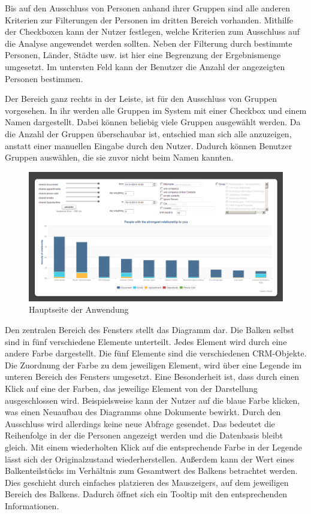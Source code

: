 Bis auf den Ausschluss von Personen anhand ihrer Gruppen sind alle anderen Kriterien zur Filterungen der Personen im dritten Bereich vorhanden. Mithilfe der Checkboxen kann der Nutzer festlegen, welche Kriterien zum Ausschluss auf die Analyse angewendet werden sollten. Neben der Filterung durch bestimmte Personen, Länder, Städte usw. ist hier eine Begrenzung der Ergebnismenge umgesetzt. Im untersten Feld kann der Benutzer die Anzahl der angezeigten Personen bestimmen.

Der Bereich ganz rechts in der Leiste, ist für den Ausschluss von Gruppen vorgesehen. In ihr werden alle Gruppen im System mit einer Checkbox und einem Namen dargestellt. Dabei können beliebig viele Gruppen ausgewählt werden. Da die Anzahl der Gruppen überschaubar ist, entschied man sich alle anzuzeigen, anstatt einer manuellen Eingabe durch den Nutzer. Dadurch können Benutzer Gruppen auswählen, die sie zuvor nicht beim Namen kannten.

\begin{figure}[htbp]
\centering
\includegraphics[width=\textwidth]{pics/final_screen.png}
\caption{Hauptseite der Anwendung}
\label{ergebniss_oberflaeche_haupt}
\end{figure}

Den zentralen Bereich des Fensters stellt das Diagramm dar. Die Balken selbst sind in fünf verschiedene Elemente unterteilt. Jedes Element wird durch eine andere Farbe dargestellt. Die fünf Elemente sind die verschiedenen CRM-Objekte. Die Zuordnung der Farbe zu dem jeweiligen Element, wird über eine Legende im unteren Bereich des Fensters umgesetzt. Eine Besonderheit ist, dass durch einen Klick auf eine der Farben, das jeweilige Element von der Darstellung ausgeschlossen wird. Beispielsweise kann der Nutzer auf die blaue Farbe klicken, was einen Neuaufbau des Diagramms ohne Dokumente bewirkt. Durch den Ausschluss wird allerdings keine neue Abfrage gesendet. Das  bedeutet die Reihenfolge in der die Personen angezeigt werden und die Datenbasis bleibt gleich. Mit einem wiederholten Klick auf die entsprechende Farbe in der Legende lässt sich der Originalzustand wiederherstellen. Außerdem kann der Wert eines Balkenteilstücks im Verhältnis zum Gesamtwert des Balkens betrachtet werden. Dies geschieht durch einfaches platzieren des Mauszeigers, auf dem jeweiligen Bereich des Balkens. Dadurch öffnet sich ein Tooltip mit den entsprechenden Informationen.

